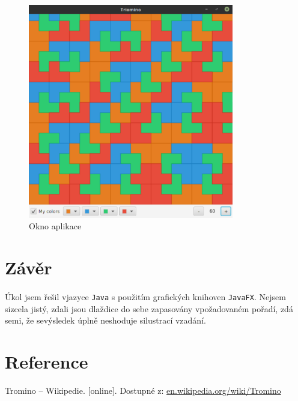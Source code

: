 \documentclass[12pt]{scrartcl}
\begin{document}
\begin{figure}[!ht]
	\centering
	\label{obr:polekolizi}
	\includegraphics[width=0.8\textwidth,natwidth=1,natheight=1]{app_gui.pdf}
	\caption{Okno aplikace}
\end{figure}

\newpage
\section{Závěr}
\paragraph{}
Úkol jsem řešil v\nobreakspace jazyce \texttt{Java} s použitím grafických knihoven \texttt{JavaFX}.
Nejsem si\nobreakspace zcela jistý, zdali jsou dlaždice do sebe zapasovány v\nobreakspace požadovaném pořadí, zdá se\nobreakspace mi, že se\nobreakspace výsledek úplně neshoduje s\nobreakspace ilustrací v\nobreakspace zadání.

\section{Reference}

Tromino – Wikipedie. [online]. Dostupné z: \href{https://en.wikipedia.org/wiki/Tromino}{en.wikipedia.org/wiki/Tromino}
\end{document}
